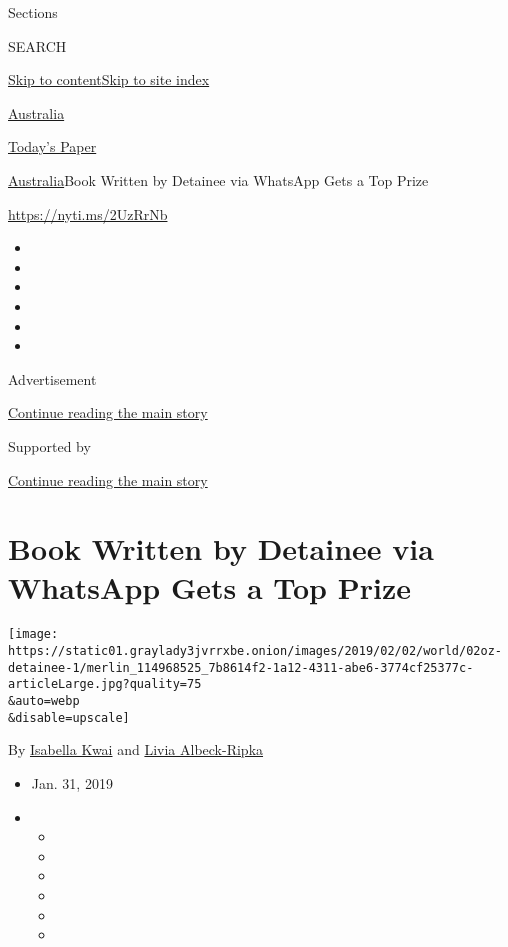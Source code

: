 Sections

SEARCH

\protect\hyperlink{site-content}{Skip to
content}\protect\hyperlink{site-index}{Skip to site index}

\href{https://www.nytimes3xbfgragh.onion/section/world/australia}{Australia}

\href{https://myaccount.nytimes3xbfgragh.onion/auth/login?response_type=cookie\&client_id=vi}{}

\href{https://www.nytimes3xbfgragh.onion/section/todayspaper}{Today's
Paper}

\href{/section/world/australia}{Australia}\textbar{}Book Written by
Detainee via WhatsApp Gets a Top Prize

\href{https://nyti.ms/2UzRrNb}{https://nyti.ms/2UzRrNb}

\begin{itemize}
\item
\item
\item
\item
\item
\item
\end{itemize}

Advertisement

\protect\hyperlink{after-top}{Continue reading the main story}

Supported by

\protect\hyperlink{after-sponsor}{Continue reading the main story}

\hypertarget{book-written-by-detainee-via-whatsapp-gets-a-top-prize}{%
\section{Book Written by Detainee via WhatsApp Gets a Top
Prize}\label{book-written-by-detainee-via-whatsapp-gets-a-top-prize}}

\texttt{[image: https://static01.graylady3jvrrxbe.onion/images/2019/02/02/world/02oz-detainee-1/merlin\_114968525\_7b8614f2-1a12-4311-abe6-3774cf25377c-articleLarge.jpg?quality=75\\\&auto=webp\\\&disable=upscale]}

By \href{https://www.nytimes3xbfgragh.onion/by/isabella-kwai}{Isabella
Kwai} and
\href{https://www.nytimes3xbfgragh.onion/by/livia-albeck-ripka}{Livia
Albeck-Ripka}

\begin{itemize}
\item
  Jan. 31, 2019
\item
  \begin{itemize}
  \item
  \item
  \item
  \item
  \item
  \item
  \end{itemize}
\end{itemize}

